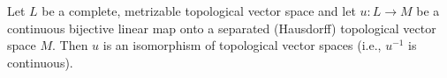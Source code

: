 Let $L$ be a complete, metrizable topological vector space and let $u: L \to M$ be a continuous bijective linear map onto a separated (Hausdorff) topological vector space $M$. Then $u$ is an isomorphism of topological vector spaces (i.e., $u^{-1}$ is continuous).
